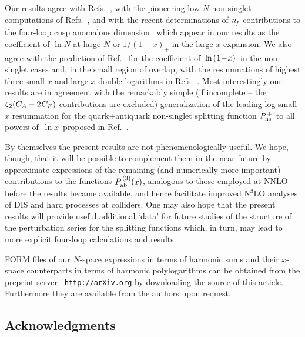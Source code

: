 \documentclass[12pt]{article}
\begin{document}
Our results agree with Refs.~\cite{LargeNf1,LargeNf2,LargeNf3}, with the
pioneering low-$N$ non-singlet computations of 
Refs.~\cite{VelizN2,VelizN34,ChP4ns2},
and with the recent determinations of ${n^{}_{\! f}}$ contributions to the four-loop 
cusp anomalous dimension~\cite{HSSS16,GHKM15,GrozinLL} which appear in our 
results as the coefficient of $\ln N$ at large $N$ or $1/(1-x)_+$ in the 
large-$x$ expansion.
We also agree with the prediction of Ref.~\cite{DMS05} for the coefficient
of $\,\ln \x1\,$ in the non-singlet cases and, in the small region of overlap, 
with the resummations of highest three small-$x$ and large-$x$ double 
logarithms in Refs.~\cite{avLL2012,DKVprp,SMVV09,ASV10}. 
Most interestingly our results are in agreement with the remarkably simple
(if incomplete -- the ${\zeta_{2}} (C_A - 2\:\! C_F)$ contributions are excluded)
generalization of the leading-log small-$x$ resummation \cite{KL82,BV95} for 
the quark$+$antiquark non-singlet splitting function $P_{\rm ns}^{\,+}$
to all powers of $\,\ln x\,$ proposed in Ref.~\cite{VelizDL}.

By themselves the present results are not phenomenologically useful. We hope, 
though, that it will be possible to complement them in the near future by
approximate expressions of the remaining (and numerically more important) 
contributions to the functions $P_{\rm ab}^{\,(3)}(x)$, analogous to those 
employed at NNLO~\cite{NVappr} before the results \cite{mvvPns,mvvPsg} became 
available, and hence facilitate improved N$^3$LO analyses of DIS and hard 
processes at colliders. 
One may also hope that the present results will provide useful additional
`data' for future studies of the structure of the perturbation series for
the splitting functions which, in turn, may lead to more explicit four-loop
calculations and results.

{\sc FORM} \cite{FORM3,TFORM,FORM4} files of our $N$-space expressions in terms
of harmonic sums \cite{Hsums,BKurth} and their $x$-space counterparts in terms 
of harmonic polylogarithms \cite{Hpols} can be obtained from the preprint 
server \ {\tt http://arXiv.org} by downloading the source of this article.
Furthermore they are available from the authors upon request.

%
\subsection*{Acknowledgments}
%
\end{document}
